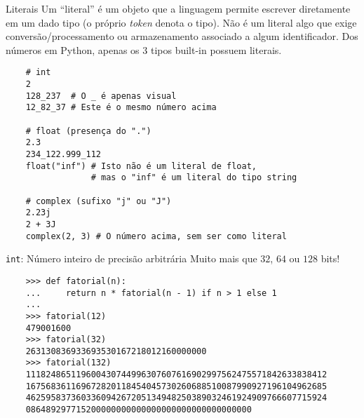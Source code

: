 \documentclass[utf8]{beamer}
\begin{document}
\begin{frame}[fragile]{Literais}
  Um ``literal'' é um objeto que a linguagem permite escrever
  diretamente em um dado tipo (o próprio \emph{token} denota o tipo).
  Não é um literal algo que exige conversão/processamento
  ou armazenamento associado a algum identificador.
  Dos números em Python, apenas os $3$ tipos built-in possuem literais.

  \begin{verbatim}
    # int
    2
    128_237  # O _ é apenas visual
    12_82_37 # Este é o mesmo número acima

    # float (presença do ".")
    2.3
    234_122.999_112
    float("inf") # Isto não é um literal de float,
                 # mas o "inf" é um literal do tipo string

    # complex (sufixo "j" ou "J")
    2.23j
    2 + 3J
    complex(2, 3) # O número acima, sem ser como literal
  \end{verbatim}

\end{frame}


\begin{frame}[fragile]{\texttt{int}:
                       Número inteiro de precisão arbitrária}
  Muito mais que $32$, $64$ ou $128$ bits!

  \begin{verbatim}
    >>> def fatorial(n):
    ...     return n * fatorial(n - 1) if n > 1 else 1
    ...
    >>> fatorial(12)
    479001600
    >>> fatorial(32)
    263130836933693530167218012160000000
    >>> fatorial(132)
    111824865119600430744996307607616902997562475571842633838412
    167568361169672820118454045730260688510087990927196104962685
    462595837360336094267205134948250389032461924909766607715924
    086489297715200000000000000000000000000000000
  \end{verbatim}

\end{frame}
\end{document}
